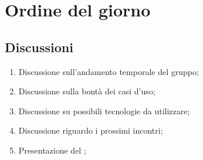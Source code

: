 \section{Ordine del giorno} 
\label{sec:agenda}
\subsection{Discussioni} 
\label{subsec:discussione}
\begin{enumerate}
    \item Discussione sull'andamento temporale del gruppo;
    \item Discussione sulla bontà dei casi d'uso;
    \item Discussione su possibili tecnologie da utilizzare;
    \item Discussione riguardo i prossimi incontri;
    \item Presentazione del ;
\end{enumerate}